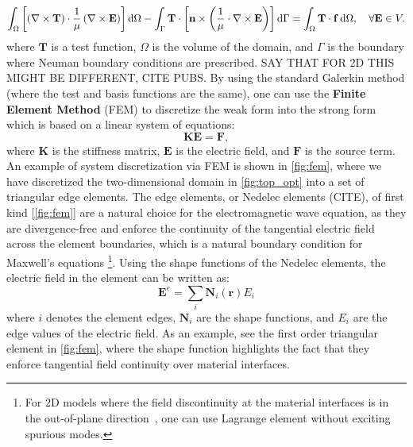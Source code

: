     \begin{equation}
        \int_\Omega \left[ \left( \nabla \times \mathbf{T} \right) \cdot
            \frac{1}{\mu} \left( \nabla \times \mathbf{E} \right) \right] \mathop{}\!\text{d} \Omega
        - \int_\Gamma \mathbf{T} \cdot \left[ \mathbf{n} \times \left(
            \frac{1}{\mu} \cdot \nabla \times \mathbf{E} \right) \right] \mathop{}\!\text{d} \Gamma \\
        = \int_\Omega \mathbf{T} \cdot \mathbf{f} \mathop{}\!\text{d} \Omega,
        \quad \forall \mathbf{E} \in V.
    \end{equation}
    where $\mathbf{T}$ is a test function, $\Omega$ is the volume of the domain,
    and $\Gamma$ is the boundary where Neuman boundary conditions
    are prescribed. SAY THAT FOR 2D THIS MIGHT BE DIFFERENT, CITE PUBS. By using
    the standard Galerkin method (where the test and basis functions are the same),
    one can use the \textbf{Finite Element Method}
    (FEM) to discretize the weak form
    into the strong form which is based on a linear system of equations:
    \begin{equation}\label{eq:discretized}
        \mathbf{K} \mathbf{E} = \mathbf{F},
    \end{equation}
    where $\mathbf{K}$ is the stiffness matrix, $\mathbf{E}$ is the electric field,
    and $\mathbf{F}$ is the source term.
    An example of system discretization via FEM is shown in \autoref{fig:fem},
    where we have discretized the two-dimensional
    domain in \autoref{fig:top_opt} into a set of triangular edge elements. The
    edge elements, or Nedelec elements (CITE),
    of first kind [\autoref{fig:fem}] are a natural choice for the electromagnetic
    wave equation, as they are divergence-free and enforce the continuity of the
    tangential electric field
    across the element boundaries, which is a natural boundary condition for
    Maxwell's equations
    \footnote{For 2D models where the field discontinuity at the material
        interfaces
        is in the out-of-plane direction~\cite{ownpub3}, one can use Lagrange element
        without
        exciting spurious modes.}. Using the shape functions of the Nedelec elements,
    the electric field in the element can be written as:
    \begin{equation}
        \boldsymbol{E}^e=\sum_i \boldsymbol{N}_i(\mathbf{r}) E_i
    \end{equation}
    where $i$ denotes the element edges, $\boldsymbol{N}_i$ are the shape
    functions, and $E_i$ are the edge values of the electric field. As an example,
    see the first order triangular element in \autoref{fig:fem}, where the shape
    function highlights the fact that they enforce tangential field
    continuity over material interfaces.

